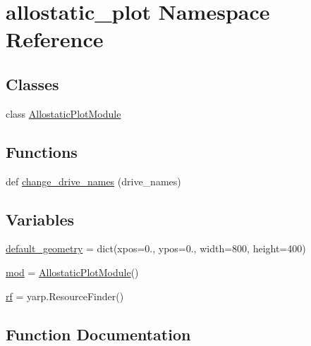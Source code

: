 \hypertarget{namespaceallostatic__plot}{}\section{allostatic\+\_\+plot Namespace Reference}
\label{namespaceallostatic__plot}
\subsection*{Classes}
\begin{DoxyCompactItemize}
\item 
class \hyperlink{classallostatic__plot_1_1AllostaticPlotModule}{Allostatic\+Plot\+Module}
\end{DoxyCompactItemize}
\subsection*{Functions}
\begin{DoxyCompactItemize}
\item 
def \hyperlink{namespaceallostatic__plot_a2cb3943d41425d0c1e59dd21ee7019a3}{change\+\_\+drive\+\_\+names} (drive\+\_\+names)
\end{DoxyCompactItemize}
\subsection*{Variables}
\begin{DoxyCompactItemize}
\item 
\hyperlink{namespaceallostatic__plot_a7f3371fbe10435cee932dcc577aaf142}{default\+\_\+geometry} = dict(xpos=0., ypos=0., width=800, height=400)
\item 
\hyperlink{namespaceallostatic__plot_a57762a93ed3c99265f85f859d1c86cf6}{mod} = \hyperlink{classallostatic__plot_1_1AllostaticPlotModule}{Allostatic\+Plot\+Module}()
\item 
\hyperlink{namespaceallostatic__plot_a4b1d388f7cddaea7d81cf5c088c3a441}{rf} = yarp.\+Resource\+Finder()
\end{DoxyCompactItemize}


\subsection{Function Documentation}
\mbox{\label{namespaceallostatic__plot_a2cb3943d41425d0c1e59dd21ee7019a3}} 
